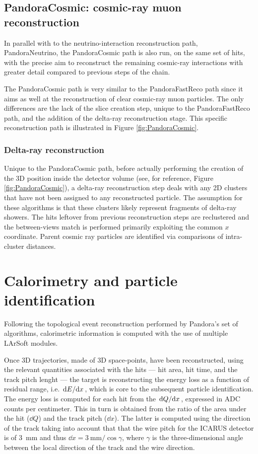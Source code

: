 \subsection{PandoraCosmic: cosmic-ray muon reconstruction}

In parallel with to the neutrino-interaction reconstruction path, PandoraNeutrino, the PandoraCosmic path is also run, on the same set of hits, with the precise aim to reconstruct the remaining cosmic-ray interactions with greater detail compared to previous steps of the chain. 

The PandoraCosmic path is very similar to the PandoraFastReco path since it aims as well at the reconstruction of clear cosmic-ray muon particles. The only differences are the lack of the slice creation step, unique to the PandoraFastReco path, and the addition of the delta-ray reconstruction stage. This specific reconstruction path is illustrated in Figure \ref{fig:PandoraCosmic}. 

\subsubsection{Delta-ray reconstruction}

Unique to the PandoraCosmic path, before actually performing the creation of the 3D position inside the detector volume (see, for reference, Figure \ref{fig:PandoraCosmic}), a delta-ray reconstruction step deals with any 2D clusters that have not been assigned to any reconstructed particle. The assumption for these algorithms is that these clusters likely represent fragments of delta-ray showers. The hits leftover from previous reconstruction steps are reclustered and the between-views match is performed primarily exploiting the common $x$ coordinate. Parent cosmic ray particles are identified via comparisons of intra-cluster distances. 

\section{Calorimetry and particle identification} 

Following the topological event reconstruction performed by Pandora's set of algorithms, calorimetric information is computed with the use of multiple LArSoft modules. 

Once 3D trajectories, made of 3D space-points, have been reconstructed, using the relevant quantities associated with the hits --- hit area, hit time, and the track pitch lenght --- the target is reconstructing the energy loss as a function of residual range, i.e. $\dv*{E}{x}$, which is core to the  subsequent particle identification. The energy loss is computed for each hit from the $\dv*{Q}{x}$, expressed in ADC counts per centimeter. This in turn is obtained from the ratio of the area under the hit ($\dd Q$) and the track pitch ($\dd x$).  The latter is computed using the direction of the track taking into account that that the wire pitch for the ICARUS detector is of \SI{3}{\mm} and thus $\dd x = \SI{3}{\mm}/\cos\gamma$, where $\gamma$ is the three-dimensional angle between the local direction of the track and the wire direction. 

